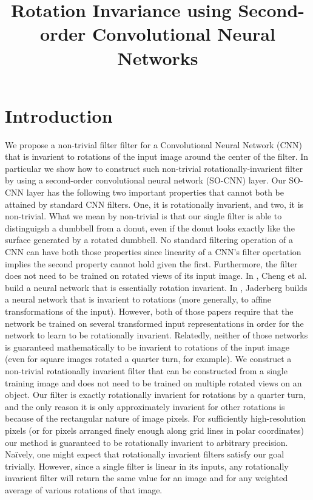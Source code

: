 \documentclass{article}
\begin{document}
\title{Rotation Invariance using Second-order Convolutional Neural Networks}

\section{Introduction}
We propose a non-trivial filter filter for a Convolutional Neural Network (CNN) that is invarient to rotations of the input image around the center of the filter. 
In particular we show how to construct such non-trivial rotationally-invarient filter by using a second-order convolutional neural network (SO-CNN) layer.
Our SO-CNN layer has the following two important properties that cannot both be attained by standard CNN filters.
One, it is rotationally invarient, and two, it is non-trivial. 
What we mean by non-trivial is that our single filter is able to distinguigsh a dumbbell from a donut, even if the donut looks exactly like the surface generated by a rotated dumbbell.
No standard filtering operation of a CNN can have both those properties since linearity of a CNN's filter opertation implies the second property cannot hold given the first.
Furthermore, the filter does not need to be trained on rotated views of its input image.
In \cite{chengzhouhan}, Cheng et al. build a neural network that is essentially rotation invarient.
In \cite{jaderberg}, Jaderberg builds a neural network that is invarient to rotations (more generally, to affine transformations of the input).
However, both of those papers require that the network be trained on several transformed input representations in order for the network to learn to be rotationally invarient.
Relatedly, neither of those networks is guaranteed mathematically to be invarient to rotations of the input image (even for square images rotated a quarter turn, for example).
We construct a non-trivial rotationally invarient filter that can be constructed from a single training image and does not need to be trained on multiple rotated views on an object.
Our filter is exactly rotationally invarient for rotations by a quarter turn, and the only reason it is only approximately invarient for other rotations is because of the rectangular nature of image pixels.
For sufficiently high-resolution pixels (or for pixels arranged finely enough along grid lines in polar coordinates) our method is guaranteed to be rotationally invarient to arbitrary precision.
Na\"ively, one might expect that rotationally invarient filters satisfy our goal trivially.
However, since a single filter is linear in its inputs, any rotationally invarient filter will return the same value for an image and for any weighted average of various rotations of that image.
\end{document}
